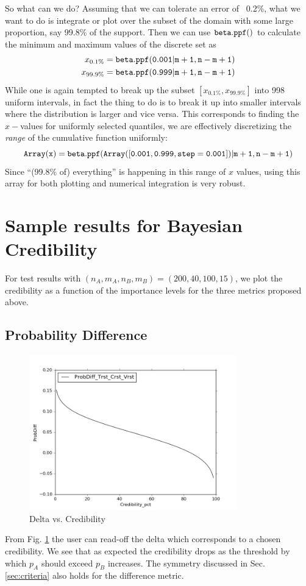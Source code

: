 \documentclass[12pt]{report}
\newcommand{\beq}{\begin{equation}} %
\newcommand{\eeq}{\end{equation}} %
\newcommand{\bdm}{\begin{displaymath}} %
\newcommand{\edm}{\end{displaymath}} %
\begin{document}
So what can we do?
Assuming that we can tolerate an error of ~0.2\%, what we want to do
is integrate or plot over the subset of the domain with
some large proportion, say 99.8\% of the support. Then we can use
\({\tt beta.ppf}()\) to calculate the minimum and maximum values of
the discrete set as
\beq
\begin{split}
  x_{0.1\%}&={\tt beta.ppf(0.001|m+1, n-m+1)}\\
  x_{99.9\%}&={\tt beta.ppf(0.999|m+1, n-m+1)}  
\end{split}
\eeq
While one is again tempted to break up the subset \([x_{0.1\%},x_{99.9\%}]\)
into 998 uniform intervals,
in fact the thing to do is to break it up into smaller intervals where the
distribution is larger and vice versa. This corresponds to finding the
\(x-\)values for uniformly selected quantiles, we are effectively
discretizing the {\em range} of the cumulative function uniformly:
\bdm
{\tt Array(x)} = {\tt beta.ppf(Array([0.001, 0.999, step = 0.001])|m+1, n-m+1)}
\edm
Since ``(99.8\% of) everything'' is happening in this range of
\(x\) values, using this array for both plotting and numerical integration is
very robust.

\section{Sample results for Bayesian Credibility}
For test results with \((n_A, m_A, n_B, m_B) = (200, 40, 100, 15)\), we plot
the credibility as a function of the importance levels for the three metrics
proposed above.

\subsection{Probability Difference}
\begin{figure}[ht!]
\centering
\includegraphics[width=90mm]{figures/ProbDiff_Trst_Crst_Vrst}
\caption{Delta vs. Credibility \label{fig:delta_vs_cred}}
\end{figure}
From Fig.  
\ref{fig:delta_vs_cred} the user can read-off the delta which
corresponds to a chosen credibility. We see
that as expected the credibility drops as the
threshold by which \(p_A\) should exceed \(p_B\) increases. The symmetry
discussed in Sec. \ref{sec:criteria} also holds for the difference
metric.
\end{document}
